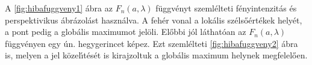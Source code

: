 \documentclass[oneside,titlepage,12pt,a4paper]{report}
\begin{document}
A \ref{fig:hibafuggveny1} ábra az $F_n(a,\lambda)$ f\"uggv\'enyt szeml\'elteti f\'enyintenzit\'as \'es perspektivikus \'abr\'azol\'ast haszn\'alva. A fehér vonal a lokális szélsőértékek helyét, a pont pedig a globális maximumot jelöli. Előbbi jól láthatóan az $F_n(a,\lambda)$ függvényen egy ún. hegygerincet képez. Ezt szemlélteti \ref{fig:hibafuggveny2} ábra is, melyen a jel k\"ozel\'\i t\'esét is kirajzoltuk a globális maximum helynek megfelel\H oen.
\begin{figure}[htb!]
  \centering
{} 

\end{figure}
\end{document}
